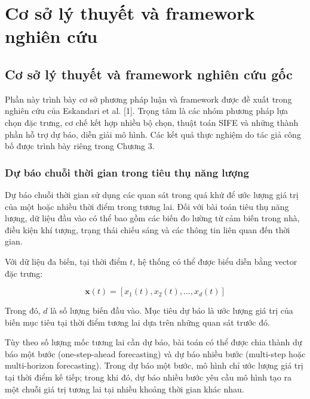 \chapter{Cơ sở lý thuyết và framework nghiên cứu}
\label{chap:theoretical-framework}


\section{Cơ sở lý thuyết và framework nghiên cứu gốc}
\label{sec:original-framework}

Phần này trình bày cơ sở phương pháp luận và framework được đề xuất
trong nghiên cứu của Eskandari et al. [1]. Trọng tâm là các nhóm
phương pháp lựa chọn đặc trưng, cơ chế kết hợp nhiều bộ chọn,
thuật toán SIFE và những thành phần hỗ trợ dự báo, diễn giải mô hình.
Các kết quả thực nghiệm do tác giả công bố được trình bày riêng
trong Chương 3.

\subsection{Dự báo chuỗi thời gian trong tiêu thụ năng lượng}
\label{subsec:time-series-theory}

Dự báo chuỗi thời gian sử dụng các quan sát trong quá khứ để ước lượng
giá trị của một hoặc nhiều thời điểm trong tương lai. Đối với bài toán
tiêu thụ năng lượng, dữ liệu đầu vào có thể bao gồm các biến đo lường
từ cảm biến trong nhà, điều kiện khí tượng, trạng thái chiếu sáng
và các thông tin liên quan đến thời gian.

Với dữ liệu đa biến, tại thời điểm $t$, hệ thống có thể được biểu diễn
bằng vector đặc trưng:

\begin{equation}
    \mathbf{x}(t)
    =
    [x_1(t),x_2(t),\ldots,x_d(t)]
    \label{eq:time-series-vector}
\end{equation}

Trong đó, $d$ là số lượng biến đầu vào. Mục tiêu dự báo là ước lượng
giá trị của biến mục tiêu tại thời điểm tương lai dựa trên những
quan sát trước đó.

Tùy theo số lượng mốc tương lai cần dự báo, bài toán có thể được chia
thành dự báo một bước (one-step-ahead forecasting) và dự báo nhiều
bước (multi-step hoặc multi-horizon forecasting). Trong dự báo một
bước, mô hình chỉ ước lượng giá trị tại thời điểm kế tiếp; trong khi
đó, dự báo nhiều bước yêu cầu mô hình tạo ra một chuỗi giá trị tương
lai tại nhiều khoảng thời gian khác nhau.

